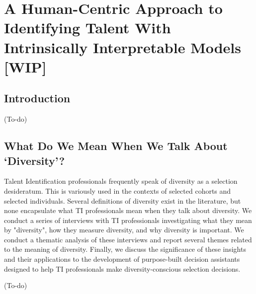 

\chapter{\label{ch:iaicasestudy}A Human-Centric Approach to Identifying Talent With Intrinsically Interpretable Models [WIP]} %

\minitoc

\section{Introduction}
(To-do)

\section{What Do We Mean When We Talk About `Diversity'?}
Talent Identification professionals frequently speak of diversity as a selection desideratum. This is variously used in the contexts of selected cohorts and selected individuals. Several definitions of diversity exist in the literature, but none encapsulate what TI professionals mean when they talk about diversity. We conduct a series of interviews with TI professionals investigating what they mean by "diversity", how they measure diversity, and why diversity is important. We conduct a thematic analysis of these interviews and report several themes related to the meaning of diversity. Finally, we discuss the significance of these insights and their applications to the development of purpose-built decision assistants designed to help TI professionals make diversity-conscious selection decisions.

(To-do)

